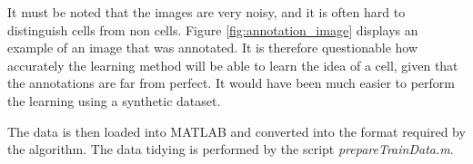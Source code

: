     It must be noted that the images are very noisy, and it is often hard to distinguish cells from non cells. Figure \ref{fig:annotation_image} displays an example of an image that was annotated. It is therefore questionable how accurately the learning method will be able to learn the idea of a cell, given that the annotations are far from perfect. It would have been much easier to perform the learning using a synthetic dataset.
    
    The data is then loaded into MATLAB and converted into the format required by the algorithm. The data tidying is performed by the script \textit{prepareTrainData.m}.